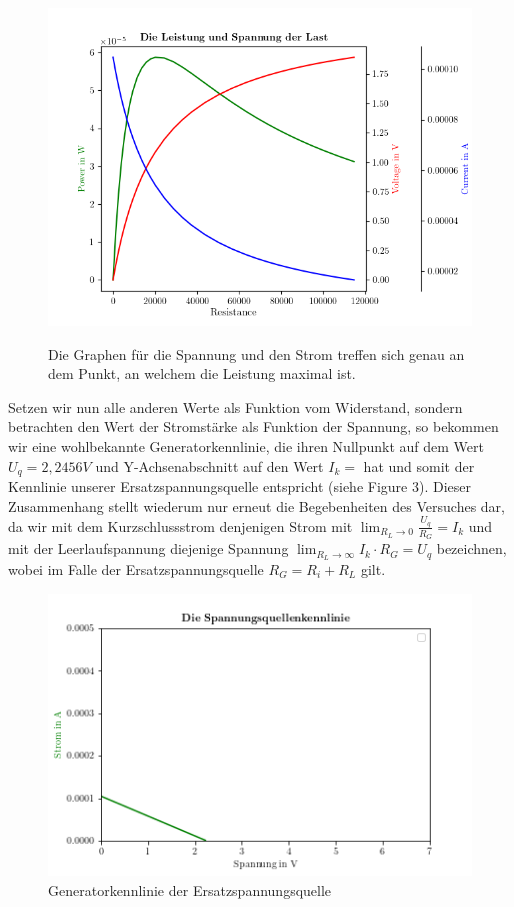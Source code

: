 \documentclass{scrarticle}
\begin{document}
\begin{figure}
  \begin{center}
    \label{fig:all}
    \includegraphics[scale=0.5]{pw_volt_rsv2.png}
    \caption{Die Graphen für die Spannung und den Strom treffen sich genau an dem Punkt, an welchem die Leistung maximal ist.}
  \end{center}
\end{figure}
Setzen wir nun alle anderen Werte als Funktion vom Widerstand, sondern betrachten den Wert der Stromstärke
als Funktion der Spannung, so bekommen wir eine wohlbekannte Generatorkennlinie, die ihren Nullpunkt auf dem Wert $U_q = 2,2456V$ und Y-Achsenabschnitt auf den Wert $I_k = $ hat und somit der Kennlinie unserer
Ersatzspannungsquelle entspricht (siehe Figure 3). Dieser Zusammenhang stellt wiederum nur erneut die Begebenheiten des Versuches dar,
da wir mit dem Kurzschlussstrom denjenigen Strom mit $\lim_{R_L\to 0} \frac{U_q}{R_G} = I_k$ und mit der Leerlaufspannung diejenige Spannung $\lim_{R_L\to\infty} I_k\cdot R_G = U_q$ bezeichnen, wobei im Falle der Ersatzspannungsquelle
$R_G = R_i + R_L$ gilt.
\begin{figure}
  \begin{center}
    \includegraphics[scale=0.4]{curr_volt.png}
    \caption{Generatorkennlinie der Ersatzspannungsquelle}
  \end{center}
\end{figure}
\end{document}
